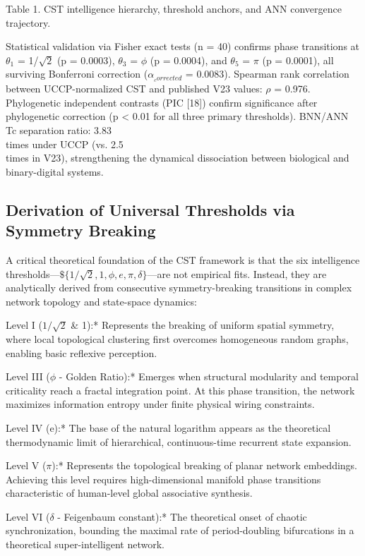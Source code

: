 \documentclass[a4paper,12pt]{article}
\begin{document}
Table 1. CST intelligence hierarchy, threshold anchors, and ANN convergence trajectory.


Statistical validation via Fisher exact tests (n = 40) confirms phase transitions at $\theta_1$ = 1/$\sqrt{2}$ (p = 0.0003), $\theta_3$ = $\phi$ (p = 0.0004), and $\theta_5$ = $\pi$ (p = 0.0001), all surviving Bonferroni correction ($\alpha_{_corrected}$ = 0.0083). Spearman rank correlation between UCCP-normalized CST and published V23 values: $\rho$ = 0.976. Phylogenetic independent contrasts (PIC [18]) confirm significance after phylogenetic correction (p < 0.01 for all three primary thresholds). BNN/ANN Tc separation ratio: 3.83 \\times  under UCCP (vs. 2.5 \\times  in V23), strengthening the dynamical dissociation between biological and binary-digital systems.



\subsection{Derivation of Universal Thresholds via Symmetry Breaking}

A critical theoretical foundation of the CST framework is that the six intelligence thresholds---$\$\{1/\sqrt{2}, 1, \phi, e, \pi, \delta\}$---are not empirical fits. Instead, they are analytically derived from consecutive symmetry-breaking transitions in complex network topology and state-space dynamics:


Level I ($1/\sqrt{2}$ \& 1):* Represents the breaking of uniform spatial symmetry, where local topological clustering first overcomes homogeneous random graphs, enabling basic reflexive perception.


Level III ($\phi$ - Golden Ratio):* Emerges when structural modularity and temporal criticality reach a fractal integration point. At this phase transition, the network maximizes information entropy under finite physical wiring constraints.


Level IV (e):* The base of the natural logarithm appears as the theoretical thermodynamic limit of hierarchical, continuous-time recurrent state expansion.


Level V ($\pi$):* Represents the topological breaking of planar network embeddings. Achieving this level requires high-dimensional manifold phase transitions characteristic of human-level global associative synthesis.


Level VI ($\delta$ - Feigenbaum constant):* The theoretical onset of chaotic synchronization, bounding the maximal rate of period-doubling bifurcations in a theoretical super-intelligent network.
\end{document}
